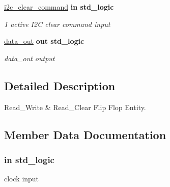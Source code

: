 \begin{DoxyCompactItemize}
\hyperlink{classflip__flop___r_w___r_c_a5565acc53d369c9aa8c7fe0abbb205f0}{i2c\+\_\+clear\+\_\+command}  {\bfseries {\bfseries \textcolor{vhdlchar}{in}\textcolor{vhdlchar}{ }}} {\bfseries \textcolor{vhdlchar}{std\+\_\+logic}\textcolor{vhdlchar}{ }} 
\begin{DoxyCompactList}\small\item\em \textquotesingle{}1\textquotesingle{} active I2C clear command input \end{DoxyCompactList}\item 
\hyperlink{classflip__flop___r_w___r_c_a8d76ddf4f2f1e1e6689a8d706fe52c10}{data\+\_\+out}  {\bfseries {\bfseries \textcolor{vhdlchar}{out}\textcolor{vhdlchar}{ }}} {\bfseries \textcolor{vhdlchar}{std\+\_\+logic}\textcolor{vhdlchar}{ }} 
\begin{DoxyCompactList}\small\item\em data\+\_\+out output \end{DoxyCompactList}\end{DoxyCompactItemize}


\subsection{Detailed Description}
Read\+\_\+\+Write \& Read\+\_\+\+Clear Flip Flop Entity. 

\subsection{Member Data Documentation}
\subsubsection[{\texorpdfstring{clk}{clk}}]{ {\bfseries \textcolor{vhdlchar}{in}\textcolor{vhdlchar}{ }} {\bfseries \textcolor{vhdlchar}{std\+\_\+logic}\textcolor{vhdlchar}{ }} \hspace{0.3cm}{\ttfamily [Port]}}\hypertarget{classflip__flop___r_w___r_c_a4a4609c199d30b3adebbeb3a01276ec5}{}\label{classflip__flop___r_w___r_c_a4a4609c199d30b3adebbeb3a01276ec5}


clock input 

